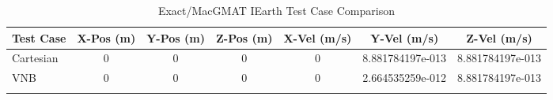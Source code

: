 \begin{table}[htbp!]
\centering
\caption{ Exact/MacGMAT IEarth Test Case Comparison}
      \begin{tabular}{lcccccc}
      \hline\hline
          Test Case & X-Pos (m) & Y-Pos (m) & Z-Pos (m) & X-Vel (m/s) & Y-Vel (m/s) & Z-Vel (m/s) \\
         \hline
         Cartesian & 0 & 0 & 0 & 0 & 8.881784197e-013 & 8.881784197e-013 \\
         VNB & 0 & 0 & 0 & 0 & 2.664535259e-012 & 8.881784197e-013 \\
      \hline\hline
      \label{Table: IEarth Exact-MacGMAT Table} 
\end{tabular}
\end{table}
